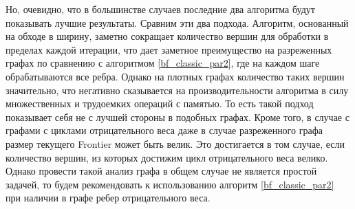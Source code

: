 Но, очевидно, что в большинстве случаев последние два алгоритма будут показывать лучшие результаты. Сравним эти два подхода. Алгоритм, основанный на обходе в ширину, заметно сокращает количество вершин для обработки в пределах каждой итерации, что дает заметное преимущество на разреженных графах по сравнению с алгоритмом \ref{bf_classic_par2}, где на каждом шаге обрабатываются все ребра. Однако на плотных графах количество таких вершин значительно, что негативно сказывается на производительности алгоритма в силу множественных и трудоемких операций с памятью. То есть такой подход показывает себя не с лучшей стороны в подобных графах. Кроме того, в случае с графами с циклами отрицательного веса даже в случае разреженного графа размер текущего Frontier может быть велик. Это достигается в том случае, если количество вершин, из которых достижим цикл отрицательного веса велико. Однако провести такой анализ графа в общем случае не является простой задачей, то будем рекомендовать к использованию алгоритм \ref{bf_classic_par2} при наличии в графе ребер отрицательного веса.

